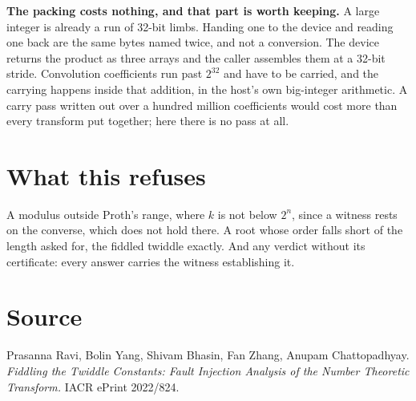\textbf{The packing costs nothing, and that part is worth keeping.} A large integer is already a run of 32-bit limbs. Handing one to the device and reading one back are the same bytes named twice, and not a conversion. The device returns the product as three arrays and the caller assembles them at a 32-bit stride. Convolution coefficients run past \(2^{32}\) and have to be carried, and the carrying happens inside that addition, in the host's own big-integer arithmetic. A carry pass written out over a hundred million coefficients would cost more than every transform put together; here there is no pass at all.

\section{What this refuses}

A modulus outside Proth's range, where \(k\) is not below \(2^n\), since a witness rests on the converse, which does not hold there. A root whose order falls short of the length asked for, the fiddled twiddle exactly. And any verdict without its certificate: every answer carries the witness establishing it.

\section{Source}

Prasanna Ravi, Bolin Yang, Shivam Bhasin, Fan Zhang, Anupam Chattopadhyay. \emph{Fiddling the Twiddle Constants: Fault Injection Analysis of the Number Theoretic Transform.} IACR ePrint 2022/824.
